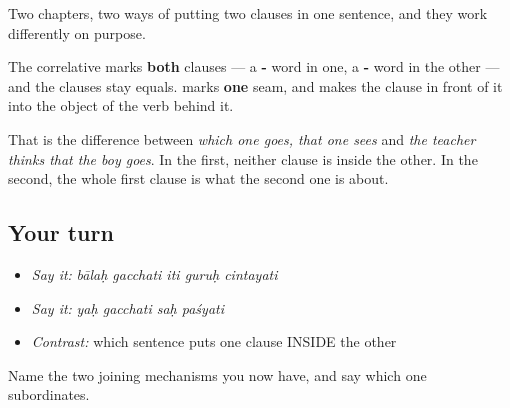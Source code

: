 \begin{grammarlens}[title={What you've built}]
Two chapters, two ways of putting two clauses in one sentence, and they work differently on purpose.

The correlative marks \textbf{both} clauses — a \textbf{-} word in one, a \textbf{-} word in the other — and the clauses stay equals. \textbf{} marks \textbf{one} seam, and makes the clause in front of it into the object of the verb behind it.

That is the difference between \emph{which one goes, that one sees} and \emph{the teacher thinks that the boy goes}. In the first, neither clause is inside the other. In the second, the whole first clause is what the second one is about.
\end{grammarlens}

\subsection*{Your turn}
\begin{itemize}
\raggedright
  \item \emph{Say it:} \emph{bālaḥ gacchati iti guruḥ cintayati}
  \item \emph{Say it:} \emph{yaḥ gacchati saḥ paśyati}
  \item \emph{Contrast:} which sentence puts one clause INSIDE the other
\end{itemize}

\begin{tcolorbox}[breakable,colback=teal!4,colframe=teal!35!black,title={Before you move on}]
Name the two joining mechanisms you now have, and say which one subordinates.
\end{tcolorbox}
